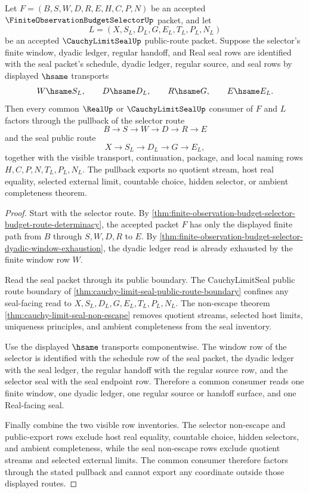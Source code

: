 \begin{theorem}
\label{thm:finite-observation-budget-selector-cauchy-limit-seal-pullback}
Let $F=(B,S,W,D,R,E,H,C,P,N)$ be an accepted $\FiniteObservationBudgetSelectorUp$ packet, and let
$$
L=(X,S_L,D_L,G,E_L,T_L,P_L,N_L)
$$
be an accepted $\CauchyLimitSealUp$ public-route packet. Suppose the selector's finite window, dyadic ledger, regular handoff, and Real seal rows are identified with the seal packet's schedule, dyadic ledger, regular source, and seal rows by displayed $\hsame$ transports
$$
W \hsame S_L,\qquad
D \hsame D_L,\qquad
R \hsame G,\qquad
E \hsame E_L.
$$
Then every common $\RealUp$ or $\CauchyLimitSealUp$ consumer of $F$ and $L$ factors through the pullback of the selector route
$$
B \to S \to W \to D \to R \to E
$$
and the seal public route
$$
X \to S_L \to D_L \to G \to E_L,
$$
together with the visible transport, continuation, package, and local naming rows $H,C,P,N,T_L,P_L,N_L$. The pullback exports no quotient stream, host real equality, selected external limit, countable choice, hidden selector, or ambient completeness theorem.
\end{theorem}
\begin{proof}
Start with the selector route. By \autoref{thm:finite-observation-budget-selector-budget-route-determinacy}, the accepted packet $F$ has only the displayed finite path from $B$ through $S,W,D,R$ to $E$. By \autoref{thm:finite-observation-budget-selector-dyadic-window-exhaustion}, the dyadic ledger read is already exhausted by the finite window row $W$.

Read the seal packet through its public boundary. The CauchyLimitSeal public route boundary of \autoref{thm:cauchy-limit-seal-public-route-boundary} confines any seal-facing read to $X,S_L,D_L,G,E_L,T_L,P_L,N_L$. The non-escape theorem \autoref{thm:cauchy-limit-seal-non-escape} removes quotient streams, selected host limits, uniqueness principles, and ambient completeness from the seal inventory.

Use the displayed $\hsame$ transports componentwise. The window row of the selector is identified with the schedule row of the seal packet, the dyadic ledger with the seal ledger, the regular handoff with the regular source row, and the selector seal with the seal endpoint row. Therefore a common consumer reads one finite window, one dyadic ledger, one regular source or handoff surface, and one Real-facing seal.

Finally combine the two visible row inventories. The selector non-escape and public-export rows exclude host real equality, countable choice, hidden selectors, and ambient completeness, while the seal non-escape rows exclude quotient streams and selected external limits. The common consumer therefore factors through the stated pullback and cannot export any coordinate outside those displayed routes.
\end{proof}

